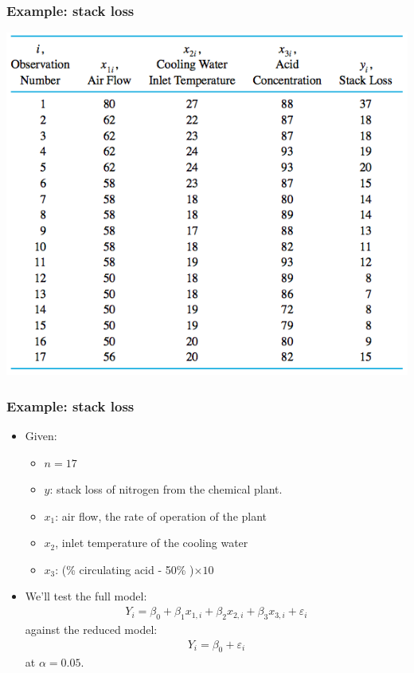 \documentclass[handout]{beamer}\usepackage[]{graphicx}\usepackage[]{color}
\providecommand{\e}{\varepsilon}
\numberwithin{equation}{section}
\begin{document}
\begin{frame}
\frametitle{Example: stack loss}
 \includegraphics{../../fig/stack.png}
\end{frame}



\begin{frame}
\frametitle{Example: stack loss}
\begin{itemize}
\item Given:
\begin{itemize}
\pause \item $n = 17$
\pause \item $y$: stack loss of nitrogen from the chemical plant.
\pause \item $x_1$: air flow, the rate of operation of the plant
\pause \item $x_2$, inlet temperature of the cooling water
\pause \item $x_3$: (\% circulating acid - 50\% )$\times 10$
\end{itemize}
\pause \item We'll test the full model: 
\begin{align*}
Y_i = \beta_0 + \beta_1 x_{1, i} + \beta_2 x_{2, i} + \beta_3 x_{3, i} + \e_i
\end{align*}
\pause against the reduced model:
\begin{align*}
Y_i = \beta_0 + \e_i
\end{align*}
at $\alpha = 0.05$.
\end{itemize}
\end{frame}
\end{document}
